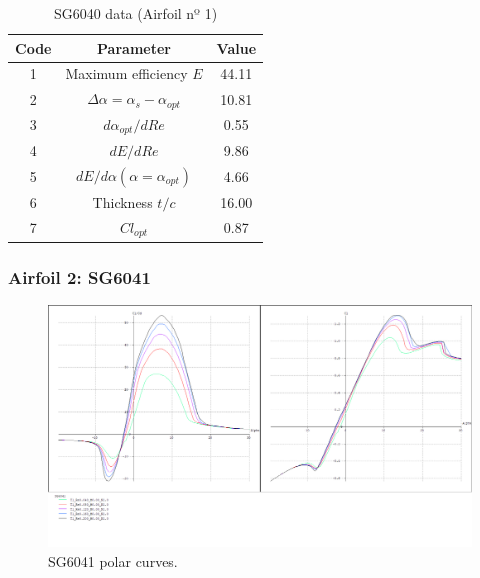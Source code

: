 \documentclass[../TFG_Annex.tex]{subfiles}
\begin{document}
\begin{table}[h!]
	\centering
	\begin{tabular}{c|c|c}
		Code & Parameter                                    & Value  \\ \hline
		1    & Maximum efficiency $E$                      &       44.11             \\
		2    & $\Delta \alpha=\alpha_{s}-\alpha_{opt}$    &            10.81         \\
		3    & ${d\alpha_{opt}}/{dRe}$                     &                0.55    \\
		4    & ${dE}/{dRe}$                                &          9.86          \\
		5    & ${dE}/{d \alpha} (\alpha=\alpha_{opt})$      &        4.66           \\
		6    & Thickness $t/c$                            &           16.00         \\
		7    & $Cl_{opt}$  & 0.87
	\end{tabular}
	\caption{SG6040 data (Airfoil nº 1)}
	\label{tab:Airf1}
\end{table}

\newpage

\subsubsection{Airfoil 2: SG6041}

\begin{figure}[h!]
	\centering
	\includegraphics[width=1\linewidth]{"../../04-Airfoil selection/Imatges airfoils/2-SG6041"}
	\caption{SG6041 polar curves.}
	\label{fig:2-sg6041}
\end{figure}
\end{document}
